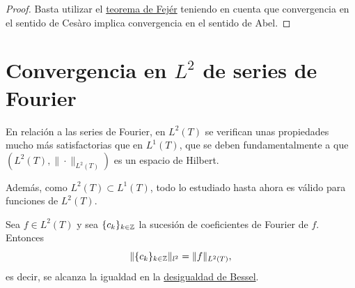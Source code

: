 \documentclass[a4paper, 11pt, oneside]{report}
\begin{document}
\begin{proof}
  Basta utilizar el \hyperref[teo:4.3.7]{\color{c1}teorema de Fejér} teniendo en cuenta que convergencia en el sentido de Cesàro implica convergencia en el sentido de Abel.
\end{proof}

\section[Convergencia en \texorpdfstring{$L^2$}{L2} de series de Fourier]{Convergencia en \texorpdfstring{\boldmath$L^2$}{L2} de series de Fourier}

En relación a las series de Fourier, en $L^2(T)$ se verifican unas propiedades mucho más satisfactorias que en $L^1(T)$, que se deben fundamentalmente a que $(L^2(T),\|\cdot\|_{L^2(T)})$ es un espacio de Hilbert.

Además, como $L^2(T) \subset L^1(T)$, todo lo estudiado hasta ahora es válido para funciones de $L^2(T)$.

\begin{theorem}\label{teo:4.5.1}
  Sea $f \in L^2(T)$ y sea $\{c_k\}_{k \in \mathbb Z}$ la sucesión de coeficientes de Fourier de $f$. Entonces
  \[\|\{c_k\}_{k \in \mathbb Z}\|_{l^2}= \|f\|_{L^2(T)},\]
  es decir, se alcanza la igualdad en la \hyperref[teo:4.1.7]{\color{c1}desigualdad de Bessel}.
\end{theorem}
\end{document}
